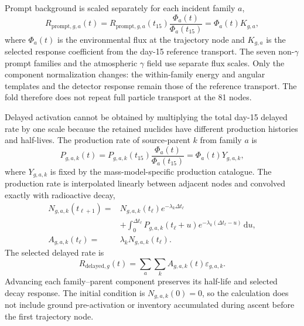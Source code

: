 \documentclass[11pt]{article}
\newcommand{\revblue}[1]{\textcolor{revisionblue}{#1}}
\begin{document}
Prompt background is scaled separately for each incident family $a$,
\begin{equation}
 R_{\mathrm{prompt},g,a}(t)
 =R_{\mathrm{prompt},g,a}(t_{15})
 \frac{\Phi_a(t)}{\Phi_a(t_{15})}
 =\Phi_a(t)K_{g,a},
 \label{eq:prompt_source_response}
\end{equation}
where $\Phi_a(t)$ is the environmental flux at the trajectory node and
$K_{g,a}$ is the selected response coefficient from the day-15 reference
transport. The seven non-$\gamma$ prompt families and the \revblue{atmospheric
$\gamma$ field} use separate flux scales. Only the component normalization
changes: the within-family energy and angular templates and the detector
response remain those of the reference transport. The fold therefore does not
repeat full particle transport at the 81 nodes.

Delayed activation cannot be obtained by multiplying the total day-15 delayed
rate by one scale because the retained nuclides have different production
histories and half-lives. The production rate of source-parent $k$ from family
$a$ is
\begin{equation}
 P_{g,a,k}(t)
 =P_{g,a,k}(t_{15})\frac{\Phi_a(t)}{\Phi_a(t_{15})}
 =\Phi_a(t)Y_{g,a,k},
 \label{eq:activation_production}
\end{equation}
where $Y_{g,a,k}$ is fixed by the mass-model-specific production catalogue.
The production rate is interpolated linearly between adjacent nodes and
convolved exactly with radioactive decay,
\begin{equation}
 \begin{aligned}
 N_{g,a,k}(t_{\ell+1})={}&N_{g,a,k}(t_\ell)e^{-\lambda_k\Delta t_\ell}\\
 &+\int_0^{\Delta t_\ell}P_{g,a,k}(t_\ell+u)
 e^{-\lambda_k(\Delta t_\ell-u)}\,\mathrm du,\\
 A_{g,a,k}(t_\ell)={}&\lambda_kN_{g,a,k}(t_\ell).
 \end{aligned}
 \label{eq:delayed_inventory}
\end{equation}
The selected delayed rate is
\begin{equation}
 R_{\mathrm{delayed},g}(t)=
 \sum_a\sum_k A_{g,a,k}(t)\varepsilon_{g,a,k}.
 \label{eq:delayed_selected}
\end{equation}
Advancing each family--parent component preserves its half-life and selected
decay response. The initial condition is $N_{g,a,k}(0)=0$, so the calculation
does not include ground pre-activation or inventory accumulated during ascent
before the first trajectory node.
\end{document}
